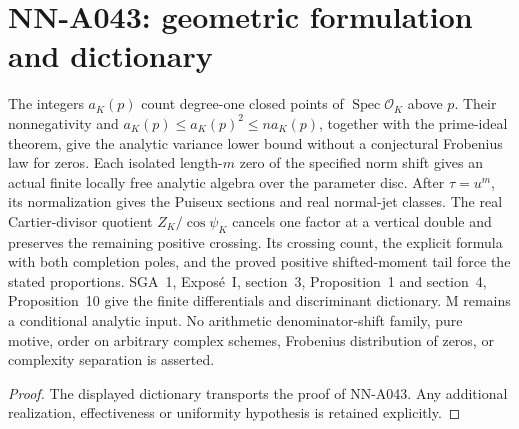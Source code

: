 \section{NN-A043: geometric formulation and dictionary}
\begin{geometricstatement}[NN-A043]
The integers $a_K(p)$ count degree-one closed points of $\operatorname{Spec}\mathcal O_K$ above $p$. Their nonnegativity and $a_K(p)\le a_K(p)^2\le n a_K(p)$, together with the prime-ideal theorem, give the analytic variance lower bound without a conjectural Frobenius law for zeros. Each isolated length-$m$ zero of the specified norm shift gives an actual finite locally free analytic algebra over the parameter disc. After $\tau=u^m$, its normalization gives the Puiseux sections and real normal-jet classes. The real Cartier-divisor quotient $Z_K/\cos\psi_K$ cancels one factor at a vertical double and preserves the remaining positive crossing. Its crossing count, the explicit formula with both completion poles, and the proved positive shifted-moment tail force the stated proportions. SGA~1, Expos\'e~I, section~3, Proposition~1 and section~4, Proposition~10 give the finite differentials and discriminant dictionary. M remains a conditional analytic input. No arithmetic denominator-shift family, pure motive, order on arbitrary complex schemes, Frobenius distribution of zeros, or complexity separation is asserted.
\end{geometricstatement}
\begin{proof} The displayed dictionary transports the proof of NN-A043. Any additional realization, effectiveness or uniformity hypothesis is retained explicitly.\end{proof}


